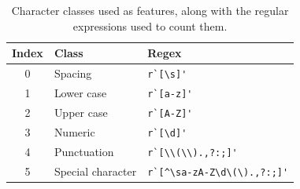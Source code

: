 \begin{table}[h]
\begin{center}
\begin{tabular}{|c|l|l|}
\hline
Index & Class & Regex\\
\hline
0 & Spacing & \verb|r`[\s]'|\\
1 & Lower case & \verb|r`[a-z]'|\\
2 & Upper case & \verb|r`[A-Z]'|\\
3 & Numeric & \verb|r`[\d]'|\\
4 & Punctuation & \verb|r`[\\(\\).,?:;]'|\\
5 & Special character & \verb|r`[^\sa-zA-Z\d\(\).,?:;]'|\\
\hline
\end{tabular}
\caption[Character classes used as features, along with the regular expressions used to count them.]{Character classes used as features, along with the regular expressions used to count them.}
\label{table:characterclasses}
\end{center}
\end{table}

